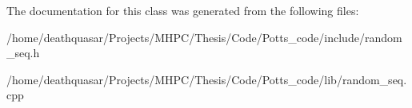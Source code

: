 The documentation for this class was generated from the following files\+:\begin{DoxyCompactItemize}
\item 
/home/deathquasar/\+Projects/\+M\+H\+P\+C/\+Thesis/\+Code/\+Potts\+\_\+code/include/random\+\_\+seq.\+h\item 
/home/deathquasar/\+Projects/\+M\+H\+P\+C/\+Thesis/\+Code/\+Potts\+\_\+code/lib/random\+\_\+seq.\+cpp\end{DoxyCompactItemize}

